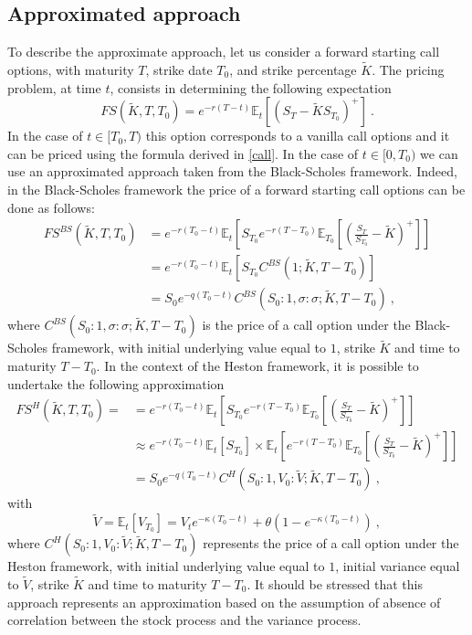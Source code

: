 \subsection{Approximated approach}
To describe the approximate approach, let us consider a forward starting call options, with maturity $T$, strike date $T_0$, and strike percentage $\tilde{K}$. 
The pricing problem, at time $t$, consists in determining the following expectation
$$
FS(\tilde{K}, T, T_0)  = e^{-r (T-t)}\mathbb{E}_t   \left[\left(S_T - \tilde{K} S_{T_0}\right)^+\right] \ .
$$
In the case of $t \in [T_0, T)$ this option corresponds to a vanilla call options and it can be priced using the formula derived in \ref{call}. 
In the case of $t \in [0, T_0)$ we can use an approximated approach taken from the Black-Scholes framework. 
Indeed, in the Black-Scholes framework the price of a forward starting call options can be done as follows:
$$
\begin{aligned}
FS^{BS}(\tilde{K}, T, T_0) 
&= e^{-r (T_0-t)} \mathbb{E}_t   \left[  S_{T_0}  e^{-r (T-T_0)} \mathbb{E}_{T_0} \left[ \left( \frac{S_T}{S_{T_0}} - \tilde{K}\right)^+\right]       \right]
\\
&=
e^{-r (T_0-t)} \mathbb{E}_t \left[ S_{T_0}  C^{BS}(1; \tilde{K}, T-T_0) \right] 
\\ &=S_0 e^{-q (T_0-t)}   C^{BS}(S_0 : 1,  \sigma :  \sigma; \tilde{K}, T-T_0) \ , 
\end{aligned}
$$
where $C^{BS}(S_0 : 1,  \sigma :  \sigma; \tilde{K}, T-T_0)$ is the price of a call option under the Black-Scholes framework, with initial underlying value equal to $1$, strike $\tilde{K}$ and time to maturity $T-T_0$.
In the context of the Heston framework, it is possible to undertake the following approximation
$$
\begin{aligned}
FS^{H}(\tilde{K}, T, T_0) = 
&= e^{-r (T_0-t)} \mathbb{E}_t   \left[  S_{T_0}  e^{-r (T-T_0)} \mathbb{E}_{T_0} \left[ \left( \frac{S_T}{S_{T_0}} - \tilde{K}\right)^+\right]       \right]
\\
&\approx e^{-r (T_0-t)} \mathbb{E}_t   \left[  S_{T_0}  \right] \times \mathbb{E}_t \left[ e^{-r (T-T_0)} \mathbb{E}_{T_0} \left[ \left( \frac{S_T}{S_{T_0}} - \tilde{K}\right)^+\right]       \right]
\\ 
&=
S_0 e^{-q (T_0-t)}   C^{H}(S_0 : 1,  V_0 : \tilde{V}   ; \tilde{K}, T-T_0) \ , 
\end{aligned}
$$
with
\begin{equation}
\label{vol-cir-exp}
\tilde{V} = \mathbb{E}_t[ V_{T_0} ] = V_t  e^{-\kappa  (T_0 -t) } + \theta \left(1 - e^{-\kappa   (T_0 -t) }\right) \ ,
\end{equation}
where $C^{H}(S_0 : 1,  V_0 : \tilde{V}   ; \tilde{K}, T-T_0) $ represents the price of a call option under the Heston framework, with initial underlying value equal to $1$, initial variance equal to $\tilde{V}$, strike $\tilde{K}$ and time to maturity $T-T_0$.
It should be stressed that this approach represents an approximation based on the assumption of absence of correlation between the stock process and the variance process. 









